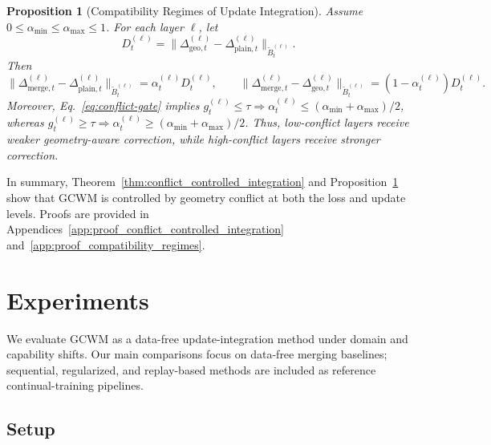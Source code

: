 \documentclass{article}
\newtheorem{proposition}{Proposition}
\begin{document}
\begin{proposition}[Compatibility Regimes of Update Integration]
\label{prop:compatibility_regimes}
Assume \(0\le \alpha_{\min}\le\alpha_{\max}\le1\). For each layer \(\ell\), let
\[
D_t^{(\ell)}
=
\bigl\|
\Delta_{\mathrm{geo},t}^{(\ell)}
-
\Delta_{\mathrm{plain},t}^{(\ell)}
\bigr\|_{\widetilde B_t^{(\ell)}}.
\]
Then
$\bigl\|
\Delta_{\mathrm{merge},t}^{(\ell)}
-
\Delta_{\mathrm{plain},t}^{(\ell)}
\bigr\|_{\widetilde B_t^{(\ell)}}
=
\alpha_t^{(\ell)}D_t^{(\ell)},
\qquad
\bigl\|
\Delta_{\mathrm{merge},t}^{(\ell)}
-
\Delta_{\mathrm{geo},t}^{(\ell)}
\bigr\|_{\widetilde B_t^{(\ell)}}
=
(1-\alpha_t^{(\ell)})D_t^{(\ell)}.$
Moreover, Eq.~\eqref{eq:conflict-gate} implies
\(g_t^{(\ell)}\le\tau \Rightarrow
\alpha_t^{(\ell)}\le(\alpha_{\min}+\alpha_{\max})/2\),
whereas
\(g_t^{(\ell)}\ge\tau \Rightarrow
\alpha_t^{(\ell)}\ge(\alpha_{\min}+\alpha_{\max})/2\).
Thus, low-conflict layers receive weaker geometry-aware correction, while high-conflict layers receive stronger correction.
\end{proposition}

In summary, Theorem~\ref{thm:conflict_controlled_integration} and Proposition~\ref{prop:compatibility_regimes} show that GCWM is controlled by geometry conflict at both the loss and update levels. Proofs are provided in Appendices~\ref{app:proof_conflict_controlled_integration} and~\ref{app:proof_compatibility_regimes}.





\vspace{-0.4em}
\section{Experiments}
\label{sec:experiments}
\vspace{-0.3em}

We evaluate GCWM as a data-free update-integration method under domain and capability shifts. Our main comparisons focus on data-free merging baselines; sequential, regularized, and replay-based methods are included as reference continual-training pipelines.

\vspace{-0.5em}
\subsection{Setup}
\label{sec:exp_setup}
\vspace{-0.3em}
\end{document}
